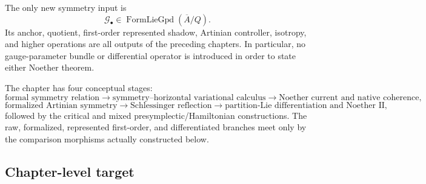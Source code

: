 The only new symmetry input is
\[
\mathcal G_\bullet\in
\operatorname{FormLieGpd}(\overline A/Q).
\]
Its anchor, quotient, first-order represented shadow, Artinian controller, isotropy,
and higher operations are all outputs of the preceding chapters.  In particular,
no gauge-parameter bundle or differential operator is introduced in order to state
either Noether theorem.

The chapter has four conceptual stages:
\[
\text{formal symmetry relation}
\longrightarrow
\text{symmetry--horizontal variational calculus}
\longrightarrow
\text{Noether current and native coherence},
\]
\[
\text{formalized Artinian symmetry}
\longrightarrow
\text{Schlessinger reflection}
\longrightarrow
\text{partition-Lie differentiation and Noether II},
\]
followed by the critical and mixed presymplectic/Hamiltonian constructions.  The
raw, formalized, represented first-order, and differentiated branches meet only by
the comparison morphisms actually constructed below.

\subsection{Chapter-level target}
\label{subsec:symmetry-noether-chapter-level-target}

